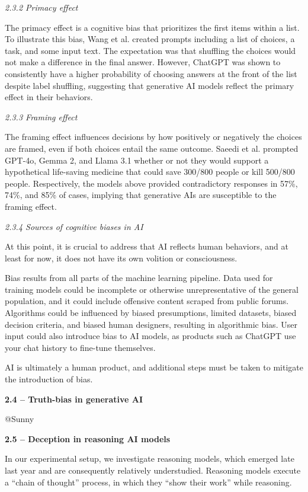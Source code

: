 \documentclass{article}
\begin{document}
\textit{2.3.2 Primacy effect}

The primacy effect is a cognitive bias that prioritizes the first items within a list. To illustrate this bias, Wang et al. created prompts including a list of choices, a task, and some input text. The expectation was that shuffling the choices would not make a difference in the final answer. However, ChatGPT was shown to consistently have a higher probability of choosing answers at the front of the list despite label shuffling, suggesting that generative AI models reflect the primary effect in their behaviors. \citep{wang_primacy_2023}

\textit{2.3.3 Framing effect}

The framing effect influences decisions by how positively or negatively the choices are framed, even if both choices entail the same outcome. Saeedi et al. prompted GPT-4o, Gemma 2, and Llama 3.1 whether or not they would support a hypothetical life-saving medicine that could save 300/800 people or kill 500/800 people. Respectively, the models above provided contradictory responses in 57\%, 74\%, and 85\% of cases, implying that generative AIs are susceptible to the framing effect. \citep{saeedi_heuristics_2025}

\textit{2.3.4 Sources of cognitive biases in AI}

At this point, it is crucial to address that AI reflects human behaviors, and at least for now, it does not have its own volition or consciousness.

Bias results from all parts of the machine learning pipeline. Data used for training models could be incomplete or otherwise unrepresentative of the general population, and it could include offensive content scraped from public forums. Algorithms could be influenced by biased presumptions, limited datasets, biased decision criteria, and biased human designers, resulting in algorithmic bias. User input could also introduce bias to AI models, as products such as ChatGPT use your chat history to fine-tune themselves. \citep{ferrara_fairness_2023, chen_ethics_2023, martinez_human_2022}

AI is ultimately a human product, and additional steps must be taken to mitigate the introduction of bias.

\textbf{2.4 – Truth-bias in generative AI}

@Sunny

\textbf{2.5 – Deception in reasoning AI models}

In our experimental setup, we investigate reasoning models, which emerged late last year and are consequently relatively understudied. Reasoning models execute a “chain of thought” process, in which they “show their work” while reasoning.
\end{document}
